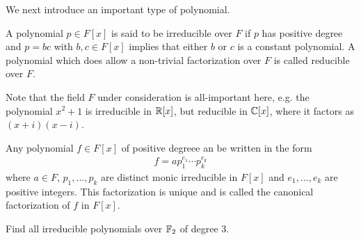 We next introduce an important type of polynomial.

\begin{definition}{}{}
    A polynomial $p\in F[x]$ is said to be irreducible over $F$
    if $p$ has positive degree and $p=bc$ with $b,c\in F[x]$ implies that either $b$ or $c$ is a constant polynomial.
    A polynomial which does allow a non-trivial factorization over $F$ is called reducible over $F$.
\end{definition}
\begin{remark}
    Note that the field $F$ under consideration is all-important here,
    e.g. the polynomial $x^2+1$ is irreducible in $\mathbb{R}[x]$, 
    but reducible in $\mathbb{C}[x]$, where it factors as $(x+i)(x-i)$.
\end{remark}

\begin{theorem}{}{}
    Any polynomial $f\in F[x]$ of positive degreee an be written in the form
    \begin{align*}
        f=ap_1^{e_1}\cdots p_k^{e_k}
    \end{align*}
    where $a\in F$, $p_1,..., p_k$ are distinct monic irreducible
    in $F[x]$ and $e_1,...,e_k$ are positive integers.
    This factorization is unique and is called the canonical factorization of $f$ in $F[x]$.
\end{theorem}

\begin{example}{}{}
    Find all irreducible polynomials over $\mathbb{F}_2$ of degree $3$.
\end{example}

